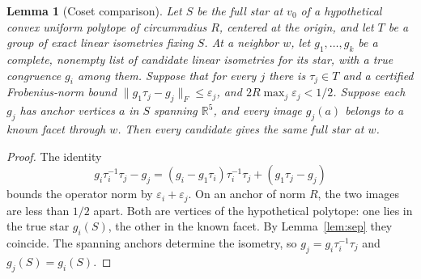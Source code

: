 \documentclass[11pt]{article}
\newtheorem{lemma}[theorem]{Lemma}
\theoremstyle{definition}
\theoremstyle{remark}
\begin{document}
\begin{appendices}
\begin{lemma}[Coset comparison]\label{lem:coset}
Let $S$ be the full star at $v_0$ of a hypothetical convex uniform
polytope of circumradius $R$, centered at the origin, and let $T$ be a
group of exact linear isometries fixing $S$. At a neighbor $w$, let $g_1,\ldots,g_k$ be a complete,
nonempty list of candidate linear isometries for its star, with a true
congruence $g_i$ among them. Suppose that for every $j$ there is
$\tau_j\in T$ and a certified Frobenius-norm bound
$\|g_1\tau_j-g_j\|_F\le\varepsilon_j$, and
$2R\max_j\varepsilon_j<1/2$. Suppose each $g_j$ has anchor vertices
$a$ in $S$ spanning $\mathbb R^5$, and every image $g_j(a)$ belongs
to a known facet through $w$. Then every candidate gives the same full
star at $w$.
\end{lemma}
\begin{proof}
The identity
\[
g_i\tau_i^{-1}\tau_j-g_j
=(g_i-g_1\tau_i)\tau_i^{-1}\tau_j+(g_1\tau_j-g_j)
\]
bounds the operator norm by $\varepsilon_i+\varepsilon_j$.
On an anchor of norm $R$, the two images are less than $1/2$ apart.
Both are vertices of the hypothetical polytope: one lies in the true
star $g_i(S)$, the other in the known facet. By Lemma~\ref{lem:sep}
they coincide. The spanning anchors determine the isometry, so
$g_j=g_i\tau_i^{-1}\tau_j$ and $g_j(S)=g_i(S)$.
\end{proof}


\end{appendices}
\end{document}

